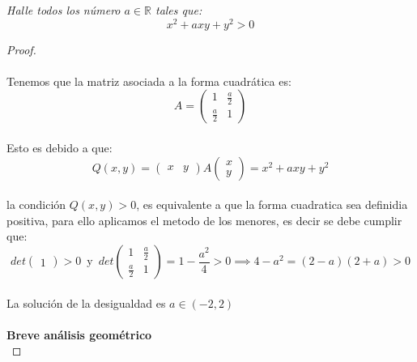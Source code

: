\documentclass[11pt,letterpaper]{article}
\newcommand{\R}{\mathbb{R}}
\begin{document}
\begin{tcolorbox}[ 
	title = \textcolor{black}{\textcolor{white}{Problema 7}},]
\textit{ Halle todos los n\'umero $a\in \R$ tales que:
\begin{equation*}
    x^2+axy+y^2>0
\end{equation*}}
\end{tcolorbox}
\begin{proof}\,\\
    \,\\
    Tenemos que la matriz asociada a la forma cuadr\'atica es:\,\\
    \begin{equation*}
        A=\begin{pmatrix}
            1&\frac{a}{2}\\
            \frac{a}{2}&1
        \end{pmatrix}
    \end{equation*}\,\\
    Esto es debido a que:\,\\
    \begin{equation*}
        Q(x,y)=\begin{pmatrix}
            x&y
        \end{pmatrix}A\begin{pmatrix}
            x\\
            y
        \end{pmatrix}=x^2+axy+y^2
    \end{equation*}\,\\
    la condici\'on $Q(x,y)>0$, es equivalente a que la forma cuadratica sea definidia positiva, para ello aplicamos el metodo de los menores, es decir se debe cumplir que:\,\\
    \begin{equation*}
        det\begin{pmatrix}
            1
        \end{pmatrix}>0\,\,\,\text{y}\,\,\,det\begin{pmatrix}
            1&\frac{a}{2}\\
            \frac{a}{2}&1
        \end{pmatrix}=1-\frac{a^2}{4}>0\implies 4-a^2=(2-a)(2+a)>0
    \end{equation*}\,\\
    La soluci\'on de la desigualdad es $a\in(-2,2)$\,\\
    \,\\
    \textbf{Breve an\'alisis geom\'etrico}\,\\

\end{proof}
\end{document}
